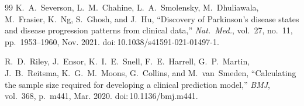 \begin{thebibliography}{99}
K.~A.~Severson, L.~M.~Chahine, L.~A.~Smolensky, M.~Dhuliawala, M.~Frasier, K.~Ng, S.~Ghosh, and J.~Hu, ``Discovery of Parkinson's disease states and disease progression patterns from clinical data,'' \textit{Nat.\ Med.}, vol.~27, no.~11, pp.~1953--1960, Nov. 2021. doi:\,10.1038/s41591-021-01497-1.

R.~D.~Riley, J.~Ensor, K.~I.~E.~Snell, F.~E.~Harrell, G.~P.~Martin, J.~B.~Reitsma, K.~G.~M.~Moons, G.~Collins, and M.~van~Smeden, ``Calculating the sample size required for developing a clinical prediction model,'' \textit{BMJ}, vol.~368, p.~m441, Mar. 2020. doi:\,10.1136/bmj.m441.

\end{thebibliography}
